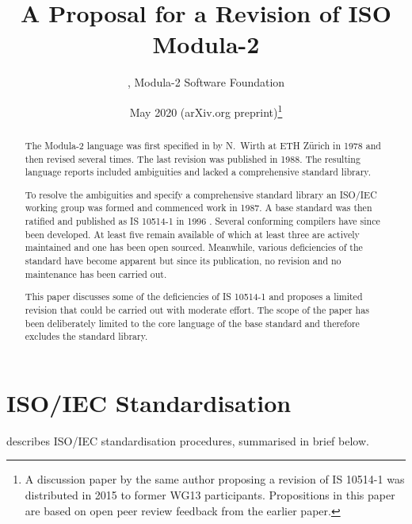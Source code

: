 \documentclass[10pt,a4paper,leqno,fleqn]{article}
\title{A Proposal for a Revision of ISO Modula-2}
\author{\BK, Modula-2 Software Foundation}
\date{\small{May 2020 (arXiv.org preprint)\footnote
{A discussion paper by the same author proposing a revision of IS 10514-1
 was distributed in 2015 to former WG13 participants. Propositions in this
 paper are based on open peer review feedback from the earlier paper.}}}
\makeatletter
\newcommand{\verbatimfont}[1]{\def\verbatim@font{#1}}
\makeatother
\begin{document}
\verbatimfont{\small\fontfamily{lmtt}\selectfont}
\maketitle

\begin{abstract}

The Modula-2 language was first specified in \cite{Wirth78} by N.~Wirth at
\Gls{ETH} Z\"{u}rich in 1978 and then revised several times. The last revision
\cite{Wirth88} was published in 1988. The resulting language reports included
ambiguities and lacked a comprehensive standard library.

To resolve the ambiguities and specify a comprehensive standard library an
ISO/IEC working group was formed and commenced work in 1987. A base
standard was then ratified and published as IS 10514-1 in 1996 \cite{ISO96}.
Several conforming compilers have since been developed. At least five remain
available of which at least three are actively maintained and one
has been open sourced.
Meanwhile, various deficiencies of the standard have become apparent but
since its publication, no revision and no maintenance has been carried out.

This paper discusses some of the deficiencies of IS 10514-1 and proposes a
limited revision that could be carried out with moderate effort. The scope of the
paper has been deliberately limited to the core language of the base standard
and therefore excludes the standard library.

\end{abstract}


\section{ISO/IEC Standardisation}

\cite{II2020} describes ISO/IEC standardisation procedures, summarised in
brief below.

\end{document}
